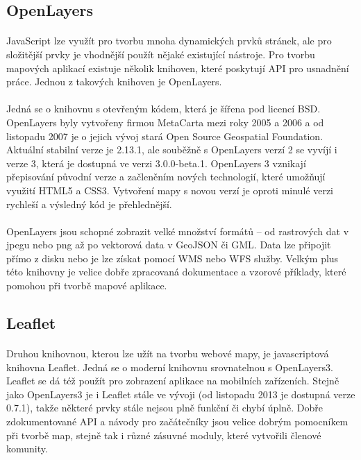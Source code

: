 \documentclass[11pt,a4paper,titlepage,oneside]{book}
\begin{document}
		\subsection{OpenLayers} %
			\paragraph{} JavaScript lze využít pro tvorbu mnoha dynamických prvků stránek, ale pro složitější prvky je vhodnější použít nějaké existující nástroje. Pro tvorbu mapových aplikací existuje několik knihoven, které poskytují  API  pro usnadnění práce. Jednou z takových knihoven je OpenLayers.
			\paragraph{} Jedná se o knihovnu s otevřeným kódem, která je šířena pod licencí BSD. OpenLayers byly vytvořeny firmou MetaCarta mezi roky 2005 a 2006 a od listopadu 2007 je o jejich vývoj stará Open Source Geospatial Foundation. Aktuální stabilní verze je 2.13.1, ale souběžně s OpenLayers verzí 2 se vyvíjí i verze 3, která je dostupná ve verzi 3.0.0-beta.1. OpenLayers 3 vznikají přepisování původní verze a začleněním nových technologií, které umožňují využití HTML5 a CSS3. Vytvoření mapy s novou verzí je oproti minulé verzi rychleší a výsledný kód je přehlednější.
			\paragraph{}OpenLayers jsou schopné zobrazit velké množství formátů -- od rastrových dat v jpegu nebo png až po vektorová data v GeoJSON či GML. Data lze připojit přímo z disku nebo je lze získat pomocí WMS nebo WFS služby. Velkým plus této knihovny je velice dobře zpracovaná dokumentace a vzorové příklady, které pomohou při tvorbě mapové aplikace. 
		\subsection{Leaflet}
			\paragraph{} Druhou knihovnou, kterou lze užít na tvorbu webové mapy, je javascriptová knihovna Leaflet. Jedná se o moderní knihovnu srovnatelnou s OpenLayers3. Leaflet se dá též použít pro zobrazení aplikace na mobilních zařízeních. Stejně jako OpenLayers3 je i Leaflet stále ve vývoji (od listopadu 2013 je dostupná verze 0.7.1), takže některé prvky stále nejsou plně funkční či chybí úplně. Dobře zdokumentované API a návody pro začátečníky jsou velice dobrým pomocníkem při tvorbě map, stejně tak i různé zásuvné moduly, které vytvořili členové komunity.
\end{document}
